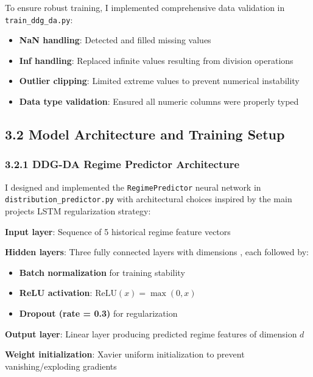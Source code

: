 \documentclass[
]{article}
\begin{document}
To ensure robust training, I implemented comprehensive data validation
in \texttt{train\_ddg\_da.py}:

\begin{itemize}
\item
  \textbf{NaN handling}: Detected and filled missing values
\item
  \textbf{Inf handling}: Replaced infinite values resulting from
  division operations
\item
  \textbf{Outlier clipping}: Limited extreme values to prevent numerical
  instability
\item
  \textbf{Data type validation}: Ensured all numeric columns were
  properly typed
\end{itemize}

\subsection{3.2 Model Architecture and Training
Setup}\label{32-model-architecture-and-training-setup}

\subsubsection{3.2.1 DDG-DA Regime Predictor
Architecture}\label{321-ddg-da-regime-predictor-architecture}

I designed and implemented the \texttt{RegimePredictor} neural network
in \texttt{distribution\_predictor.py} with architectural choices
inspired by the main project\textquotesingle s LSTM regularization
strategy:

\textbf{Input layer}: Sequence of 5 historical regime feature vectors

\textbf{Hidden layers}: Three fully connected layers with dimensions ,
each followed by:

\begin{itemize}
\item
  \textbf{Batch normalization} for training stability
\item
\textbf{ReLU activation}: $\text{ReLU}(x) = \max(0, x)$

\item
  \textbf{Dropout (rate = 0.3)} for regularization
\end{itemize}

\textbf{Output layer}: Linear layer producing predicted regime features of dimension $d$


\textbf{Weight initialization}: Xavier uniform initialization to prevent
vanishing/exploding gradients
\end{document}

